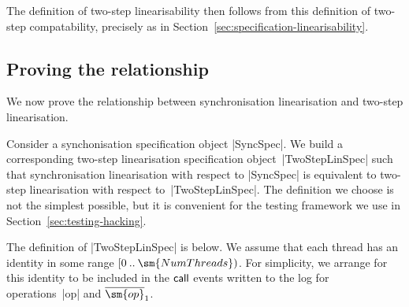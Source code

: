 The definition of two-step linearisability then follows from this definition
of two-step compatability, precisely as in
Section~\ref{sec:specification-linearisability}.



\subsection{Proving the relationship}
\label{sec:twoStepLinSpec}

We now prove the relationship between synchronisation linearisation and
two-step linearisation.

Consider a synchonisation specification object |SyncSpec|.  We build a
corresponding two-step linearisation specification object~|TwoStepLinSpec|
such that synchronisation linearisation with respect to |SyncSpec| is
equivalent to two-step linearisation with respect to~|TwoStepLinSpec|.  The
definition we choose is not the simplest possible, but it is convenient for
the testing framework we use in Section~\ref{sec:testing-hacking}.  

The definition of |TwoStepLinSpec| is below.  We assume that each thread has
an identity in some range $\range 0 {\sm{NumThreads}}$.  For simplicity, we
arrange for this identity to be included in the $\mathsf{call}$ events written to the
log for operations~|op| and $\overline{\sm{op}}_1$. 

